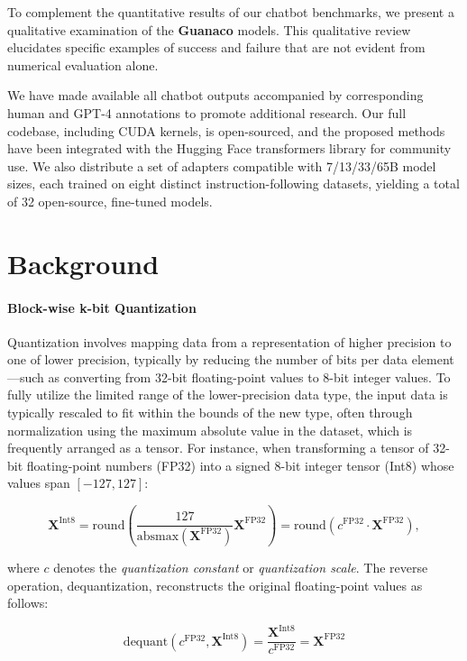 To complement the quantitative results of our chatbot benchmarks, we present a qualitative examination of the \textbf{Guanaco} models. This qualitative review elucidates specific examples of success and failure that are not evident from numerical evaluation alone.

We have made available all chatbot outputs accompanied by corresponding human and GPT-4 annotations to promote additional research. Our full codebase, including CUDA kernels, is open-sourced, and the proposed methods have been integrated with the Hugging Face transformers library \citep{wolf2019huggingface} for community use. We also distribute a set of adapters compatible with 7/13/33/65B model sizes, each trained on eight distinct instruction-following datasets, yielding a total of 32 open-source, fine-tuned models.

\section{Background}
\paragraph{Block-wise k-bit Quantization} Quantization involves mapping data from a representation of higher precision to one of lower precision, typically by reducing the number of bits per data element—such as converting from 32-bit floating-point values to 8-bit integer values. To fully utilize the limited range of the lower-precision data type, the input data is typically rescaled to fit within the bounds of the new type, often through normalization using the maximum absolute value in the dataset, which is frequently arranged as a tensor. For instance, when transforming a tensor of 32-bit floating-point numbers (FP32) into a signed 8-bit integer tensor (Int8) whose values span $[-127, 127]$:

\begin{equation}
    \mathbf{X}^{ \text{Int8}} = \text{round}\left( \frac{127}{{\text{absmax}}(\mathbf{X}^{{\text{FP32}}})}\mathbf{X}^{{\text{FP32}}} \right) = \text{round}(c^{\text{FP32}}\cdot \mathbf{X}^{{\text{FP32}}}),
\end{equation}

where $c$ denotes the {\em quantization constant} or {\em quantization scale}. The reverse operation, dequantization, reconstructs the original floating-point values as follows:

\begin{equation}
    \text{dequant}(c^{\text{FP32}}, \mathbf{X}^{\text{Int8}}) = \frac{\mathbf{X}^{\text{Int8}}}{c^{\text{FP32}}} = \mathbf{X}^{\text{FP32}}
\end{equation}

